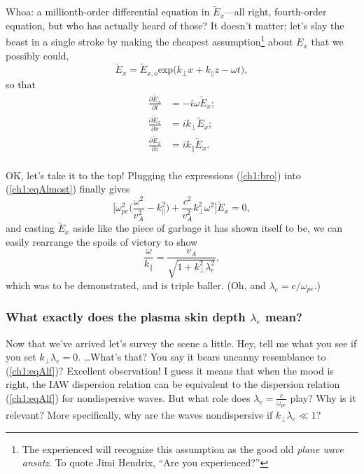 Whoa: a millionth-order differential equation in $\tilde E_x$---all right,
fourth-order equation, but who has actually heard of those? It doesn't matter;
let's slay the beast in a single stroke by making the cheapest
assumption\footnote{The experienced will recognize this assumption as the good
  old \emph{plane wave ansatz}. To quote Jimi Hendrix, ``Are you experienced?''}
about $E_x$ that we possibly could,
\begin{equation*}
  \tilde E_x = \tilde E_{x,o} \mathrm{exp} \Big ( k_\perp x + k_\parallel z - \omega t \Big ),
\end{equation*}
so that 
\begin{equation} \label{ch1:bro}
  \begin{alignedat}{2}
\frac{\partial \tilde E_x}{\partial t} &=  -i \omega \tilde E_x; \\
\frac{\partial \tilde E_x}{\partial x} &=   i k_\perp \tilde E_x; \\
\frac{\partial \tilde E_x}{\partial z} &=   i k_\parallel \tilde E_x. \\
  \end{alignedat}
\end{equation}

OK, let's take it to the top! Plugging the expressions (\ref{ch1:bro}) into
(\ref{ch1:eqAlmost}) finally gives
\begin{equation} \label{ch1:bro}
  \Big [ \omega_{pe}^2 \Big ( \dfrac{\omega^2}{v_A^2} - k_\parallel^2 \Big ) + \dfrac{c^2}{v_A^2} k_\perp^2 \omega^2 \Big ] \tilde E_x = 0,
\end{equation}
and casting $\tilde E_x$ aside like the piece of garbage it has shown itself to
be, we can easily rearrange the spoils of victory to show
\begin{equation}
  \dfrac{\omega}{k_\parallel} = \dfrac{v_A}{ \sqrt{1 + k_\perp^2 \lambda_e^2 }},
\end{equation}
which was to be demonstrated, and is triple baller. (Oh, and $\lambda_e = c /
\omega_{pe}$.)

\subsubsection{What exactly does the plasma skin depth $\lambda_e$ mean?} 

Now that we've arrived let's survey the scene a little. Hey, tell me what you
see if you set $k_\perp \lambda_e = 0$. \dots What's that? You say it bears
uncanny resemblance to (\ref{ch1:eqAlf})? Excellent observation! I guess it
means that when the mood is right, the IAW dispersion relation can be
equivalent to the dispersion relation (\ref{ch1:eqAlf}) for nondispersive \Alf
waves. But what role does $\lambda_e = \frac{c}{\omega_{pe}}$ play?  Why is it
relevant? More specifically, why are the waves nondispersive if $k_\perp
\lambda_e \ll 1$?

